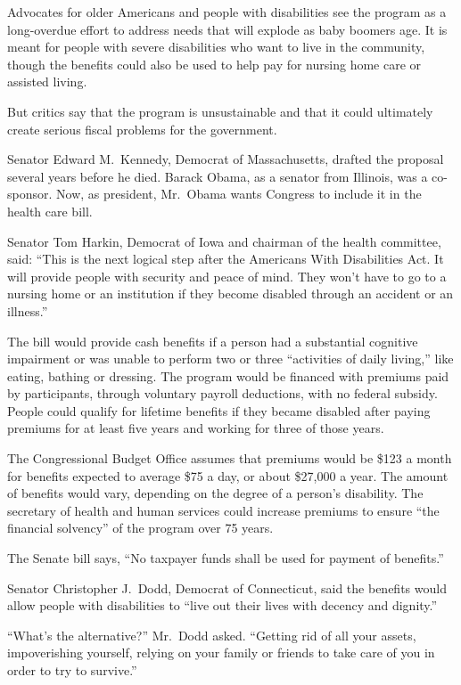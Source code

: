 ﻿\documentclass[12pt]{article}
\begin{document}
Advocates for older Americans and people with disabilities see the program as a long-overdue effort
to address needs that will explode as baby boomers age. It is meant for people with severe
disabilities who want to live in the community, though the benefits could also be used to help pay
for nursing home care or assisted living.

But critics say that the program is unsustainable and that it could ultimately create serious fiscal
problems for the government.

Senator Edward M.~Kennedy, Democrat of Massachusetts, drafted the proposal several years before he
died. Barack Obama, as a senator from Illinois, was a co-sponsor. Now, as president, Mr.~Obama wants
Congress to include it in the health care bill.

Senator Tom Harkin, Democrat of Iowa and chairman of the health committee, said: ``This is the next
logical step after the Americans With Disabilities Act. It will provide people with security and
peace of mind. They won't have to go to a nursing home or an institution if they become disabled
through an accident or an illness.''

The bill would provide cash benefits if a person had a substantial cognitive impairment or was
unable to perform two or three ``activities of daily living,'' like eating, bathing or dressing. The
program would be financed with premiums paid by participants, through voluntary payroll deductions,
with no federal subsidy. People could qualify for lifetime benefits if they became disabled after
paying premiums for at least five years and working for three of those years.

The Congressional Budget Office assumes that premiums would be \$123 a month for benefits expected
to average \$75 a day, or about \$27,000 a year. The amount of benefits would vary, depending on the
degree of a person's disability. The secretary of health and human services could increase premiums
to ensure ``the financial solvency'' of the program over 75 years.

The Senate bill says, ``No taxpayer funds shall be used for payment of benefits.''

Senator Christopher J.~Dodd, Democrat of Connecticut, said the benefits would allow people with
disabilities to ``live out their lives with decency and dignity.''

``What's the alternative?'' Mr.~Dodd asked. ``Getting rid of all your assets, impoverishing
yourself, relying on your family or friends to take care of you in order to try to survive.''
\end{document}
